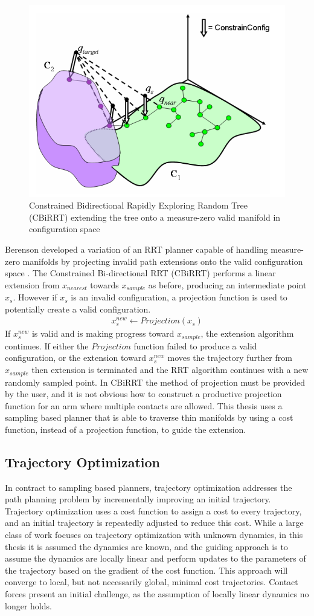 \documentclass[../thesis.tex]{subfiles}
\begin{document}
\begin{figure}
  \centering
  \includegraphics[width=.5\linewidth]{./RelatedWork/CBiRRT.png}
  \caption{Constrained Bidirectional Rapidly Exploring Random Tree (CBiRRT) extending the tree onto a measure-zero valid manifold in configuration space}
  \label{fig:CiBRRT}
\end{figure}


Berenson developed a variation of an RRT planner capable of handling measure-zero manifolds by projecting invalid path extensions onto the valid configuration space \cite{Berenson2009a}.
The Constrained Bi-directional RRT (CBiRRT) performs a linear extension from $x_{nearest}$ towards $x_{sample}$ as before, producing an intermediate point $x_s$.
However if $x_s$ is an invalid configuration, a projection function is used to potentially create a valid configuration.
\begin{align}
  x_s^{new} \leftarrow Projection(x_s)
\end{align}
If $x_s^{new}$ is valid and is making progress toward $x_{sample}$, the extension algorithm continues.
If either the $Projection$ function failed to produce a valid configuration, or the extension toward $x_s^{new}$ moves the trajectory further from $x_{sample}$ then extension is terminated and the RRT algorithm continues with a new randomly sampled point.
In CBiRRT the method of projection must be provided by the user, and it is not obvious how to construct a productive projection function for an arm where multiple contacts are allowed. 
This thesis uses a sampling based planner that is able to traverse thin manifolds by using a cost function, instead of a projection function, to guide the extension.



\subsection{Trajectory Optimization}
In contract to sampling based planners, trajectory optimization addresses the path planning problem by incrementally improving an initial trajectory.
Trajectory optimization uses a cost function to assign a cost to every trajectory, and an initial trajectory is repeatedly adjusted to reduce this cost.
While a large class of work focuses on trajectory optimization with unknown dynamics, in this thesis it is assumed the dynamics are known, and the guiding approach is to assume the dynamics are locally linear and perform updates to the parameters of the trajectory based on the gradient of the cost function.
This approach will converge to local, but not necessarily global, minimal cost trajectories.
Contact forces present an initial challenge, as the assumption of locally linear dynamics no longer holds.
\end{document}
